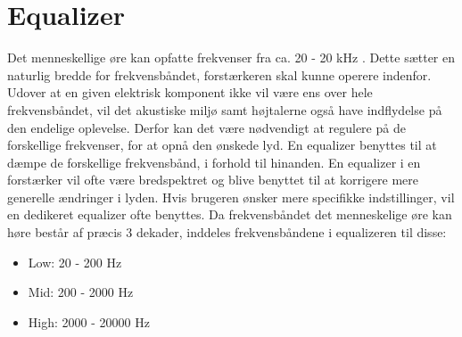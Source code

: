 \section{Equalizer}
\label{equalizer}
Det menneskellige øre kan opfatte frekvenser fra ca. 20 - 20 kHz \cite{hertz}. Dette sætter en naturlig bredde for frekvensbåndet, forstærkeren skal kunne operere indenfor. Udover at en given elektrisk komponent ikke vil være ens over hele frekvensbåndet, vil det akustiske miljø samt højtalerne også have indflydelse på den endelige oplevelse.  Derfor kan det være nødvendigt at regulere på de forskellige frekvenser, for at opnå den ønskede lyd. En equalizer benyttes til at dæmpe de forskellige frekvensbånd, i forhold til hinanden. En equalizer i en forstærker vil ofte være bredspektret og blive benyttet til at korrigere mere generelle ændringer i lyden. Hvis brugeren ønsker mere specifikke indstillinger, vil en dedikeret equalizer ofte benyttes. Da frekvensbåndet det menneskelige øre kan høre består af præcis 3 dekader, inddeles frekvensbåndene i equalizeren til disse:

\begin{itemize}
\item Low: 20 - 200 Hz
\item Mid: 200 - 2000 Hz
\item High: 2000 - 20000 Hz
\end{itemize}

